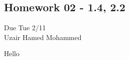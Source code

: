 \begin{center}
    \section*{Homework 02 - 1.4, 2.2}
    Due Tue 2/11 \\
    Uzair Hamed Mohammed
  \end{center}

  Hello
